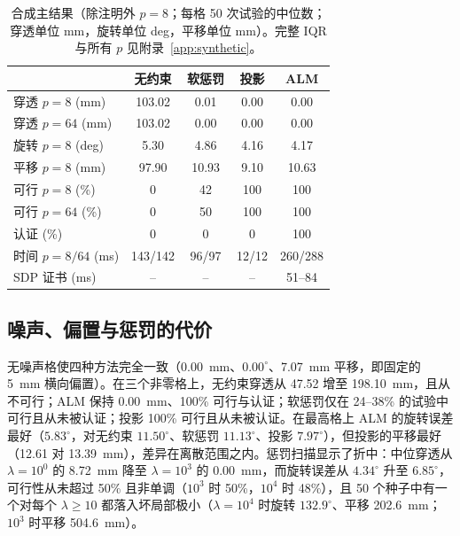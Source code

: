 \begin{table}[t]
\centering
\caption{合成主结果（除注明外 $p=8$；每格 50 次试验的中位数；穿透单位 mm，旋转单位 deg，平移单位 mm）。完整 IQR 与所有 $p$ 见附录~\ref{app:synthetic}。}
\label{tab:synthetic}
\footnotesize
\setlength{\tabcolsep}{3pt}
\begin{tabular}{@{}lcccc@{}}
\toprule
 & 无约束 & 软惩罚 & 投影 & \textbf{ALM} \\
\midrule
穿透 $p{=}8$ (mm) & 103.02 & 0.01 & 0.00 & 0.00 \\
穿透 $p{=}64$ (mm) & 103.02 & 0.00 & 0.00 & 0.00 \\
旋转 $p{=}8$ (deg) & 5.30 & 4.86 & 4.16 & 4.17 \\
平移 $p{=}8$ (mm) & 97.90 & 10.93 & 9.10 & 10.63 \\
可行 $p{=}8$ (\%) & 0 & 42 & 100 & 100 \\
可行 $p{=}64$ (\%) & 0 & 50 & 100 & 100 \\
认证 (\%) & 0 & 0 & 0 & 100 \\
时间 $p{=}8/64$ (ms) & 143/142 & 96/97 & 12/12 & 260/288 \\
SDP 证书 (ms) & -- & -- & -- & 51--84 \\
\bottomrule
\end{tabular}
\end{table}

\subsection{噪声、偏置与惩罚的代价}\label{sec:noise}
无噪声格使四种方法完全一致（0.00~mm、$0.00^\circ$、7.07~mm 平移，即固定的 5~mm 横向偏置）。在三个非零格上，无约束穿透从 47.52 增至 198.10~mm，且从不可行；ALM 保持 0.00~mm、100\% 可行与认证；软惩罚仅在 24--38\% 的试验中可行且从未被认证；投影 100\% 可行且从未被认证。在最高格上 ALM 的旋转误差最好（$5.83^\circ$，对无约束 $11.50^\circ$、软惩罚 $11.13^\circ$、投影 $7.97^\circ$），但投影的平移最好（12.61 对 13.39~mm），差异在离散范围之内。惩罚扫描显示了折中：中位穿透从 $\lambda=10^0$ 的 8.72~mm 降至 $\lambda=10^3$ 的 0.00~mm，而旋转误差从 $4.34^\circ$ 升至 $6.85^\circ$，可行性从未超过 50\% 且非单调（$10^3$ 时 50\%，$10^4$ 时 48\%），且 50 个种子中有一个对每个 $\lambda\ge10$ 都落入坏局部极小（$\lambda=10^4$ 时旋转 $132.9^\circ$、平移 202.6~mm；$10^3$ 时平移 504.6~mm）。

